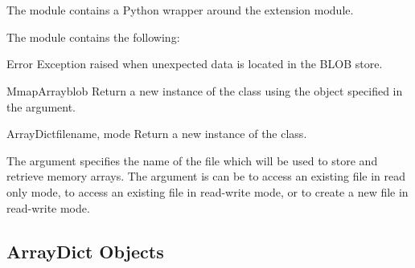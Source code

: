 %
%
%
\section{}


The  module contains a Python wrapper around the
 extension module.

The  module contains the following:

\begin{excdesc}{Error}
Exception raised when unexpected data is located in the BLOB store.
\end{excdesc}

\begin{classdesc}{MmapArray}{blob}
Return a new instance of the  class using the
 object specified in the  argument.
\end{classdesc}

\begin{classdesc}{ArrayDict}{filename, mode }
Return a new instance of the  class.

The  argument specifies the name of the file which will
be used to store and retrieve memory arrays.  The  argument
is can be  to access an existing file in read only mode,
 to access an existing file in read-write mode, or
 to create a new file in read-write mode.
\end{classdesc}

\subsection{ArrayDict Objects}

